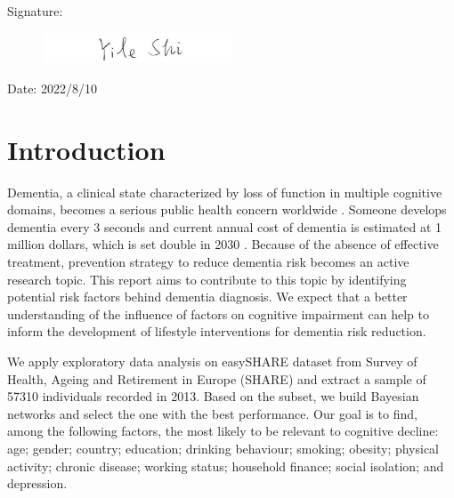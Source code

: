 \documentclass[11pt,twoside]{article}
\numberwithin{Theorem}{section}
\numberwithin{Definition}{section}
\numberwithin{Lemma}{section}
\numberwithin{Algorithm}{section}
\numberwithin{equation}{section}
\begin{document}
\vspace{1cm}

Signature:

\begin{figure}[!h]
	\includegraphics[width = 0.5\textwidth]{Images/Signature.png}
\end{figure}

\vspace{5mm}

Date: 2022/8/10

\clearpage


\pagestyle{plain}
\setcounter{page}{1}

\tableofcontents

\setcounter{page}{1}

\nocite{*}

\clearpage

\section{Introduction}
\label{sec:intro}

Dementia, a clinical state characterized by loss of function in multiple cognitive domains, becomes a serious public health concern worldwide \cite{seixas2014bayesian}. Someone develops dementia every 3 seconds and current annual cost of dementia is estimated at 1 million dollars, which is set double in 2030 \cite{alzheimer2019world}. Because of the absence of effective treatment, prevention strategy to reduce dementia risk becomes an active research topic. This report aims to contribute to this topic by identifying potential risk factors behind dementia diagnosis. We expect that a better understanding of the influence of factors on cognitive impairment can help to inform the development of lifestyle interventions for dementia risk reduction. 

We apply exploratory data analysis on easySHARE dataset from Survey of Health, Ageing and Retirement in Europe (SHARE) and extract a sample of 57310 individuals recorded in 2013. Based on the subset, we build Bayesian networks and select the one with the best performance. Our goal is to find, among the following factors, the most likely to be relevant to cognitive decline: age; gender; country; education; drinking behaviour; smoking; obesity; physical activity; chronic disease; working status; household finance; social isolation; and depression. 
\end{document}
